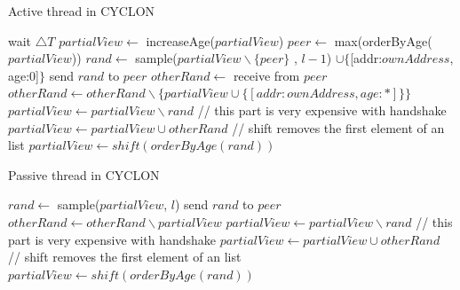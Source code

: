 \documentclass[11pt, english, screen]{report-rd-info}
\begin{document}
\begin{algorithm*}[!htbp]
    \caption{Active thread in CYCLON}
    \begin{algorithmic}[1]
        \State wait $\bigtriangleup T$
        \State $partialView \gets$ increaseAge($partialView$)
        \State $peer \gets$ max(orderByAge($partialView$))
        \State $rand \gets $ sample($partialView \backslash \{peer\}$ , $l-1$) $\cup \{$[addr:$ownAddress$, age:$0$]$\}$
        \State send $rand$ to $peer$
        \State $otherRand \gets $ receive from $peer$
        \State $otherRand \gets otherRand \backslash \{partialView \cup \{[addr:ownAddress, age:*]\}\}$
        \State $partialView \gets partialView \backslash rand$
        \State
        \State // this part is very expensive with handshake
        \State $partialView \gets partialView \cup otherRand$
        \State
        \State // shift removes the first element of an list
        \State $partialView \gets shift(orderByAge(rand))$
        \EndWhile
        \EndWhile
    \end{algorithmic}
    \label{alg:cyclon1}
\end{algorithm*}

\begin{algorithm*}[!htbp]
    \caption{Passive thread in CYCLON}
    \begin{algorithmic}[1]
        \State $rand \gets$ sample($partialView$, $l$)
        \State send $rand$ to $peer$
        \State $otherRand \gets otherRand \backslash partialView$
        \State $partialView \gets partialView \backslash rand$
        \State
        \State // this part is very expensive with handshake
        \State $partialView \gets partialView \cup otherRand$
        \State
        \State // shift removes the first element of an list
        \State $partialView \gets shift(orderByAge(rand))$
        \EndWhile
        \EndProcedure
    \end{algorithmic}
    \label{alg:cyclon2}
\end{algorithm*}






\end{document}

